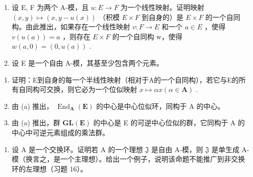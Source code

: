 \begin{enumerate}
\def\labelenumi{\arabic{enumi}.}
\setcounter{enumi}{24}
\item
  设 E, F 为两个 A-模，且 \(u: E \to F\) 为一个线性映射。证明映射 \((x, y) \mapsto (x, y - u(x))\) （积模 \(E \times F\) 到自身的）是 \(E \times F\) 的一个自同构。由此推出，如果存在一个线性映射 \(v: F \to E\) 和一个 \(a \in E\) ，使得 \(v(u(a)) = a\) ，则存在 \(E \times F\) 的一个自同构 w，使得 \(w(a, 0) = (0, u(a))\) .
\item
  设 E 是一个自由 A-模，其基至少包含两个元素。
\end{enumerate}

\begin{enumerate}
\def\labelenumi{(\alph{enumi})}
\item
  证明：E到自身的每一个半线性映射（相对于A的一个自同构），若它与E的所有自同构可交换，则它必为一个位似映射 \(x \mapsto \alpha x (\alpha \in \mathbf{A})\) .
\item
  由 (a) 推出， \(\operatorname{End}_{\mathbf{A}}(\mathbf{E})\) 的中心是中心位似环，同构于 A 的中心。
\item
  由 (a) 推出，群 \(\mathbf{GL}(\mathbf{E})\) 的中心是 E 的可逆中心位似的群，它同构于 A 的中心中可逆元素组成的乘法群。
\end{enumerate}

\begin{enumerate}
\def\labelenumi{\arabic{enumi}.}
\setcounter{enumi}{26}
\tightlist
\item
  设 A 是一个交换环。证明若 A 的一个理想 \(\mathfrak{J}\) 是自由 A-模，则 \(\mathfrak{J}\) 是单生成 A-模（换言之，是一个主理想）。给出一个例子，说明该命题不能推广到非交换环的左理想（习题 16）。
\end{enumerate}

